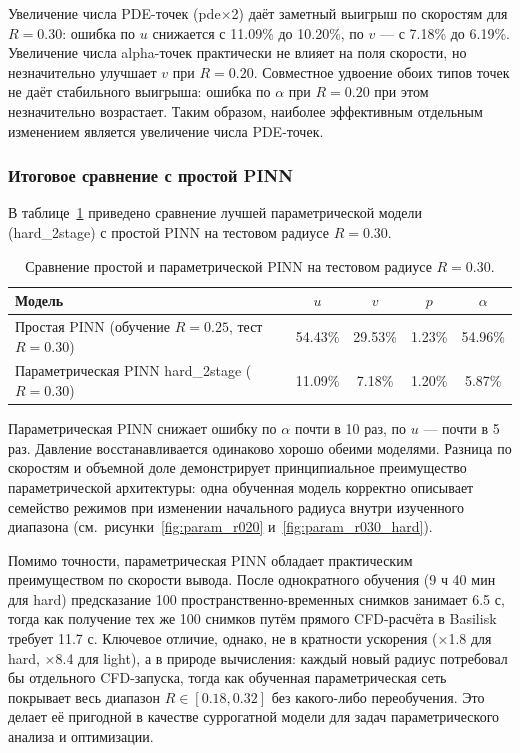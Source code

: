 \documentclass[12pt,a4paper]{article}
\begin{document}
Увеличение числа PDE-точек (pde$\times$2) даёт заметный выигрыш по скоростям
для \(R=0.30\): ошибка по \(u\) снижается с 11.09\% до 10.20\%, по \(v\) ---
с 7.18\% до 6.19\%. Увеличение числа alpha-точек практически не влияет на
поля скорости, но незначительно улучшает \(v\) при \(R=0.20\). Совместное
удвоение обоих типов точек не даёт стабильного выигрыша: ошибка по \(\alpha\)
при \(R=0.20\) при этом незначительно возрастает. Таким образом, наиболее
эффективным отдельным изменением является увеличение числа PDE-точек.

\subsubsection{Итоговое сравнение с простой PINN}

В таблице~\ref{tab:simple_vs_param} приведено сравнение лучшей параметрической
модели (hard\_2stage) с простой PINN на тестовом радиусе \(R=0.30\).

\begin{table}[H]
    \centering
    \begin{tabular}{l|cccc}
        \hline
        Модель & \(u\) & \(v\) & \(p\) & \(\alpha\) \\
        \hline
        Простая PINN (обучение \(R=0.25\), тест \(R=0.30\)) & 54.43\% & 29.53\% & 1.23\% & 54.96\% \\
        Параметрическая PINN hard\_2stage (\(R=0.30\))        & 11.09\% & 7.18\% & 1.20\% & 5.87\% \\
        \hline
    \end{tabular}
    \caption{Сравнение простой и параметрической PINN на тестовом радиусе \(R=0.30\).}
    \label{tab:simple_vs_param}
\end{table}

Параметрическая PINN снижает ошибку по \(\alpha\) почти в 10 раз, по \(u\) ---
почти в 5 раз. Давление восстанавливается одинаково хорошо обеими моделями.
Разница по скоростям и объемной доле демонстрирует принципиальное преимущество
параметрической архитектуры: одна обученная модель корректно описывает семейство
режимов при изменении начального радиуса внутри изученного диапазона
(см.~рисунки~\ref{fig:param_r020} и~\ref{fig:param_r030_hard}).

Помимо точности, параметрическая PINN обладает практическим преимуществом по
скорости вывода. После однократного обучения (9 ч 40 мин для hard) предсказание
100 пространственно-временных снимков занимает 6.5 с, тогда как получение тех
же 100 снимков путём прямого CFD-расчёта в Basilisk требует 11.7 с. Ключевое
отличие, однако, не в кратности ускорения (×1.8 для hard, ×8.4 для light), а в
природе вычисления: каждый новый радиус потребовал бы отдельного CFD-запуска,
тогда как обученная параметрическая сеть покрывает весь диапазон
$R \in [0.18, 0.32]$ без какого-либо переобучения. Это делает её пригодной в
качестве суррогатной модели для задач параметрического анализа и оптимизации.
\end{document}
